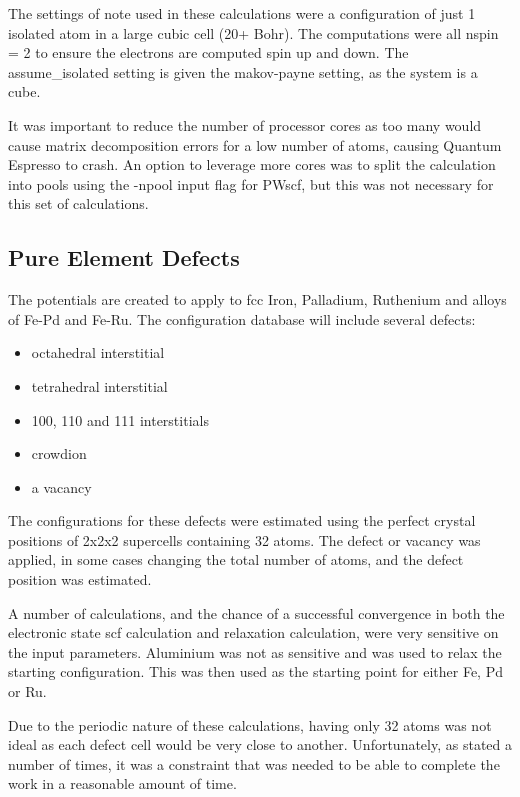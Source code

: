 The settings of note used in these calculations were a configuration of just 1 isolated atom in a large cubic cell (20+ Bohr).  The computations were all nspin = 2 to ensure the electrons are computed spin up and down.  The assume\_isolated setting is given the makov-payne setting, as the system is a cube.

It was important to reduce the number of processor cores as too many would cause matrix decomposition errors for a low number of atoms, causing Quantum Espresso to crash.  An option to leverage more cores was to split the calculation into pools using the -npool input flag for PWscf, but this was not necessary for this set of calculations.




\subsection{Pure Element Defects}

The potentials are created to apply to \acrshort{fcc} Iron, Palladium, Ruthenium and alloys of Fe-Pd and Fe-Ru.  The configuration database will include several defects:

\begin{itemize}
\item octahedral interstitial
\item tetrahedral interstitial
\item 100, 110 and 111 interstitials
\item crowdion
\item a vacancy
\end{itemize}

The configurations for these defects were estimated using the perfect crystal positions of 2x2x2 supercells containing 32 atoms.  The defect or vacancy was applied, in some cases changing the total number of atoms, and the defect position was estimated.

A number of calculations, and the chance of a successful convergence in both the electronic state \acrshort{scf} calculation and relaxation calculation, were very sensitive on the input parameters.  Aluminium was not as sensitive and was used to relax the starting configuration.  This was then used as the starting point for either Fe, Pd or Ru.

Due to the periodic nature of these calculations, having only 32 atoms was not ideal as each defect cell would be very close to another.  Unfortunately, as stated a number of times, it was a constraint that was needed to be able to complete the work in a reasonable amount of time.

